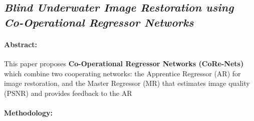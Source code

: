 \subsection{\textit{Blind Underwater Image Restoration using Co-Operational Regressor Networks}\cite{Devecioglu_2024}}

\paragraph{Abstract:}
This paper proposes \textbf{Co-Operational Regressor Networks (CoRe-Nets)} which combine two cooperating networks: the Apprentice Regressor (AR) for image restoration, and the Master Regressor (MR) that estimates image quality (PSNR) and provides feedback to the AR

\paragraph{Methodology:}
